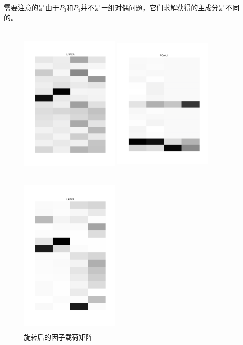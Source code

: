 需要注意的是由于$P_3$和$P_4$并不是一组对偶问题，它们求解获得的主成分是不同的。
\begin{figure}[H]
    \centering
    \begin{minipage}[t]{0.3\textwidth}
    \includegraphics[width=4.9cm,height=8cm]{pics/lab1/l1-pca-rotated.pdf}
    \end{minipage}
    \begin{minipage}[t]{0.3\textwidth}
    \includegraphics[width=4.9cm,height=8cm]{pics/lab1/pca-l1-rotated.pdf}
    \end{minipage}
    \begin{minipage}[t]{0.3\textwidth}
    \includegraphics[width=4.9cm, height=8cm]{pics/lab1/l2-pca-rotated.pdf}
    \end{minipage}
    \caption{旋转后的因子载荷矩阵}
    \label{compare-rotate}
\end{figure}

